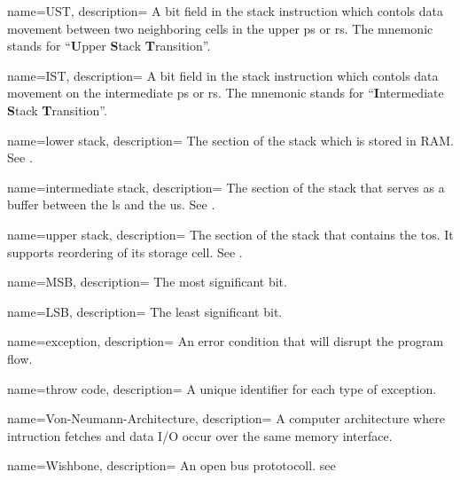  {
    name={UST},
    description={
      A bit field in the stack instruction which contols data movement
      between two neighboring \glspl{cell} in the upper \gls{ps} or \gls{rs}.
      The mnemonic stands for ``\textbf{U}pper \textbf{S}tack \textbf{T}ransition''.
      \nopostdesc
    }
}

 {
    name={IST},
    description={
      A bit field in the stack instruction which contols data movement
      on the intermediate \gls{ps} or \gls{rs}.
      The mnemonic stands for
      ``\textbf{I}ntermediate \textbf{S}tack \textbf{T}ransition''.
      \nopostdesc
    }
}

 {
    name={lower stack},
    description={
      The section of the stack which is stored in RAM.
      See . 
      \nopostdesc
    }
}

 {
    name={intermediate stack},
    description={
      The section of the stack that serves as a buffer between the
      \gls{ls} and the \gls{us}.
      See . 
      \nopostdesc
    }
}

 {
    name={upper stack},
    description={
      The section of the stack that contains the \gls{tos}. It supports
      reordering of its storage \gls{cell}.
      See . 
      \nopostdesc
    }
}

 {
    name={MSB},
    description={
      The most significant bit.
      \nopostdesc
    }
}

 {
    name={LSB},
    description={
      The least significant bit.
      \nopostdesc
    }
}

 {
    name={exception},
    description={
      An error condition that will disrupt the program flow.
      \nopostdesc
    }
}

 {
    name={throw code},
    description={
      A unique identifier for each type of exception.
      \nopostdesc
    }
}

 {
    name={Von-Neumann-Architecture},
    description={
      A computer architecture where intruction fetches and data I/O occur
      over the same memory interface.
      \nopostdesc
    }
}

 {
    name={Wishbone},
    description={
      An open bus prototocoll. see \cite{wishbone}
      \nopostdesc
    }
}

